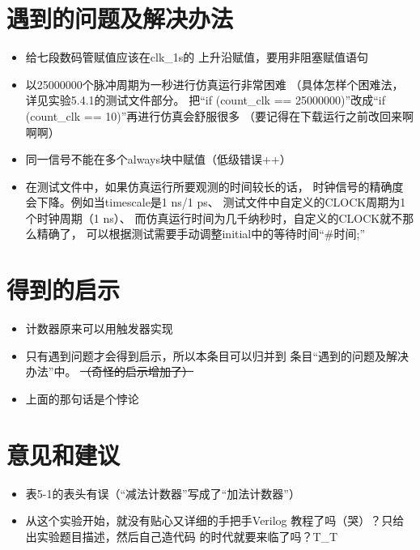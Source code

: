 \documentclass[12pt,a4paper,UTF8]{article}
\begin{document}
\section{遇到的问题及解决办法}
\begin{itemize}
  \item 给七段数码管赋值应该在clk\_1s的
        上升沿赋值，要用非阻塞赋值语句
  \item 以25000000个脉冲周期为一秒进行仿真运行非常困难
        （具体怎样个困难法，详见实验5.4.1的测试文件部分。
        把``if (count\_clk == 25000000)''\linebreak[4]
        改成``if (count\_clk == 10)''再进行仿真会舒服很多
        （要记得在下载运行之前改回来啊啊啊）
  \item 同一信号不能在多个always块中赋值（低级错误++）
  \item 在测试文件中，如果仿真运行所要观测的时间较长的话，
        时钟信号的精确度会下降。例如当timescale是1 ns/1 ps、
        测试文件中自定义的CLOCK周期为1个时钟周期（1 ns）、
        而仿真运行时间为几千纳秒时，自定义的CLOCK就不那么精确了，
        可以根据测试需要手动调整\linebreak[4]
        initial中的等待时间``\#时间;''
\end{itemize}

\section{得到的启示}
\begin{itemize}
  \item 计数器原来可以用触发器实现
  \item 只有遇到问题才会得到启示，所以本条目可以归并到
        条目``遇到的问题及解决办法''中。
        \sout{（奇怪的启示增加了）}
  \item 上面的那句话是个悖论
\end{itemize}

\section{意见和建议}
\begin{itemize}
  \item 表5-1的表头有误（``减法计数器''写成了``加法计数器''）
  \item 从这个实验开始，就没有贴心又详细的手把手Verilog
        教程了吗（哭）？只给出实验题目描述，然后自己造代码
        的时代就要来临了吗？T\_T
\end{itemize}
\end{document}
